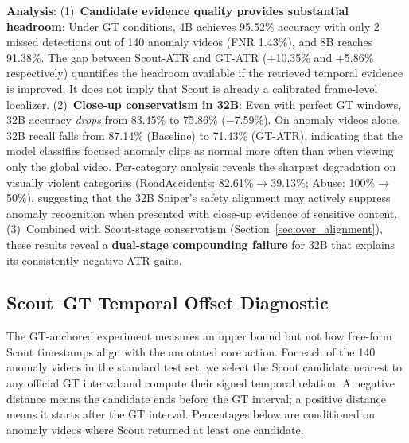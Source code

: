 \textbf{Analysis}:
(1)~\textbf{Candidate evidence quality provides substantial headroom}: Under GT conditions, 4B achieves 95.52\% accuracy with only 2 missed detections out of 140 anomaly videos (FNR 1.43\%), and 8B reaches 91.38\%. The gap between Scout-ATR and GT-ATR (+10.35\% and +5.86\% respectively) quantifies the headroom available if the retrieved temporal evidence is improved. It does not imply that Scout is already a calibrated frame-level localizer.
(2)~\textbf{Close-up conservatism in 32B}: Even with perfect GT windows, 32B accuracy \emph{drops} from 83.45\% to 75.86\% ($-$7.59\%). On anomaly videos alone, 32B recall falls from 87.14\% (Baseline) to 71.43\% (GT-ATR), indicating that the model classifies focused anomaly clips as normal more often than when viewing only the global video. Per-category analysis reveals the sharpest degradation on visually violent categories (RoadAccidents: 82.61\%$\rightarrow$39.13\%; Abuse: 100\%$\rightarrow$50\%), suggesting that the 32B Sniper's safety alignment may actively suppress anomaly recognition when presented with close-up evidence of sensitive content.
(3)~Combined with Scout-stage conservatism (Section~\ref{sec:over_alignment}), these results reveal a \textbf{dual-stage compounding failure} for 32B that explains its consistently negative ATR gains.

\subsection{Scout--GT Temporal Offset Diagnostic}
\label{sec:scout_offset}

The GT-anchored experiment measures an upper bound but not how free-form Scout timestamps align with the annotated core action. For each of the 140 anomaly videos in the standard test set, we select the Scout candidate nearest to any official GT interval and compute their signed temporal relation. A negative distance means the candidate ends before the GT interval; a positive distance means it starts after the GT interval. Percentages below are conditioned on anomaly videos where Scout returned at least one candidate.

\begin{table}[t]
  \centering
  \caption{Scout candidate position relative to the nearest official GT interval. ``Before/overlap/after'' uses the original Scout timestamps.}
  \label{tab:scout_offset}
\end{table}

